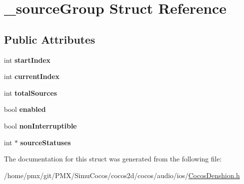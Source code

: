 \hypertarget{struct__sourceGroup}{}\section{\+\_\+source\+Group Struct Reference}
\label{struct__sourceGroup}
\subsection*{Public Attributes}
\begin{DoxyCompactItemize}
\item 
\mbox{\label{struct__sourceGroup_aedf60c32c9f50907a1d7c4ceffebd34a}} 
int {\bfseries start\+Index}
\item 
\mbox{\label{struct__sourceGroup_ac8d629bee48fa95ffe085739c29c8393}} 
int {\bfseries current\+Index}
\item 
\mbox{\label{struct__sourceGroup_af92866596e1c52d38901abb5986f1404}} 
int {\bfseries total\+Sources}
\item 
\mbox{\label{struct__sourceGroup_af41ac2109bf5383ea0c7e2816553055f}} 
bool {\bfseries enabled}
\item 
\mbox{\label{struct__sourceGroup_a31063e653ba9ea9e93ba48131c704b4d}} 
bool {\bfseries non\+Interruptible}
\item 
\mbox{\label{struct__sourceGroup_acb7a8f480d20d5a662e7273bb3e96ac4}} 
int $\ast$ {\bfseries source\+Statuses}
\end{DoxyCompactItemize}


The documentation for this struct was generated from the following file\+:\begin{DoxyCompactItemize}
\item 
/home/pmx/git/\+P\+M\+X/\+Simu\+Cocos/cocos2d/cocos/audio/ios/\hyperlink{cocos2d_2cocos_2audio_2ios_2CocosDenshion_8h}{Cocos\+Denshion.\+h}\end{DoxyCompactItemize}

